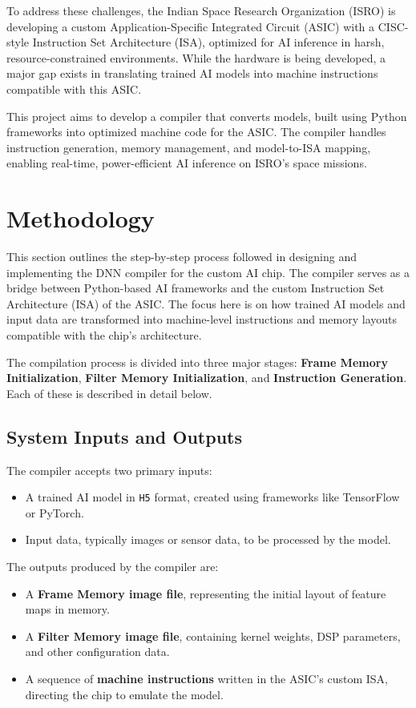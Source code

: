 \documentclass[12pt]{report}
\begin{document}
To address these challenges, the Indian Space Research Organization (ISRO) is developing a custom Application-Specific Integrated Circuit (ASIC) with a CISC-style Instruction Set Architecture (ISA), optimized for AI inference in harsh, resource-constrained environments. While the hardware is being developed, a major gap exists in translating trained AI models into machine instructions compatible with this ASIC.

This project aims to develop a compiler that converts models, built using Python frameworks into optimized machine code for the ASIC. The compiler handles instruction generation, memory management, and model-to-ISA mapping, enabling real-time, power-efficient AI inference on ISRO’s space missions.

\chapter{Methodology}
This section outlines the step-by-step process followed in designing and implementing the DNN compiler for the custom AI chip. The compiler serves as a bridge between Python-based AI frameworks and the custom Instruction Set Architecture (ISA) of the ASIC. The focus here is on how trained AI models and input data are transformed into machine-level instructions and memory layouts compatible with the chip's architecture. 

The compilation process is divided into three major stages: \textbf{Frame Memory Initialization}, \textbf{Filter Memory Initialization}, and \textbf{Instruction Generation}. Each of these is described in detail below.

\section{System Inputs and Outputs}

The compiler accepts two primary inputs:
\begin{itemize}
    \item A trained AI model in \texttt{H5} format, created using frameworks like TensorFlow or PyTorch.
    \item Input data, typically images or sensor data, to be processed by the model.
\end{itemize}

The outputs produced by the compiler are:
\begin{itemize}
    \item A \textbf{Frame Memory image file}, representing the initial layout of feature maps in memory.
    \item A \textbf{Filter Memory image file}, containing kernel weights, DSP parameters, and other configuration data.
    \item A sequence of \textbf{machine instructions} written in the ASIC's custom ISA, directing the chip to emulate the model.
\end{itemize}
\end{document}
